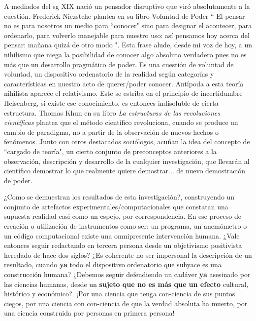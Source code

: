 A mediados del sg XIX nació un pensador disruptivo que viró absolutamente a la cuestión. Frederick Niezstche plantea en su libro Voluntad de Poder \cite{nietzsche2018voluntad} `` El pensar no es para nosotros un medio para ``conocer" sino para designar el acontecer, para ordenarlo, para volverlo manejable para nuestro uso: así pensamos hoy acerca del pensar: mañana quizá de otro modo ". Esta frase alude, desde mi voz de hoy, a un nihilismo que niega la posibilidad de conocer algo absoluto verdadero pues no es más que un desarrollo pragmático de poder. Es una cuestión de voluntad de voluntad, un dispositivo ordenatorio de la realidad según categorías y características en nuestro acto de querer/poder conocer. Antípoda a esta teoría nihilista aparece el relativismo. Este se estriba en el principio de incertidumbre Heisenberg, si existe ese conocimiento, es entonces indisoluble de cierta estructura. Thomas Khun en su libro \emph{La estructuras de las revoluciones científicas} \cite{kuhn2019estructura} plantea que el método científico revoluciona, cuando se produce un cambio de paradigma, no a partir de la observación de nuevos hechos o fenómenos. Junto con otros destacados sociólogos, acuñan la idea del concepto de ``cargado de teoría", un cierto conjunto de preconceptos anteriores a la observación, descripción y desarrollo de la cualquier investigación, que llevarán al científico demostrar lo que realmente quiere demostrar... de nuevo demostración de poder.

¿Como se demuestran los resultados de esta investigación?, construyendo un conjunto de artefactos experimentales/computacionales que constatan una supuesta realidad casi como un espejo, por correspondencia. En ese proceso de creación o utilización de instrumentos como ser: un programa, un anemómetro o un código computacional existe una omnipresente intervención humana. ¿Vale entonces seguir redactando en tercera persona desde un objetivismo positivista heredado de hace dos siglos? ¿Es coherente no ser impersonal la descripción de un resultado, cuando \textbf{ya} todo el dispositivo ordenatorio que subyace es una construcción humana? ¿Debemos seguir defendiendo un cadáver \textbf{ya} asesinado por las ciencias humanas, desde un \textbf{sujeto que no es más que un efecto} cultural, histórico y económico?. ¡Por una ciencia que tenga con-ciencia de sus puntos ciegos, por una ciencia con con-ciencia de que la verdad absoluta ha muerto, por una ciencia construida por personas en primera persona!  